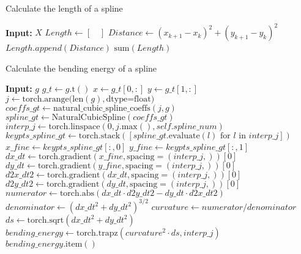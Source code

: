 \documentclass{article}
\begin{document}
\begin{algorithm}
\caption{Calculate the length of a spline}
\begin{algorithmic}[1]
\STATE \textbf{Input:} $X$
\STATE $Length \leftarrow [\quad]$
    \STATE $Distance \leftarrow (x_{k+1}-x_{k})^2+(y_{k+1}-y_{k})^2$
    \STATE $Length.append(Distance)$
\ENDFOR
\RETURN $\text{sum}(Length)$
\end{algorithmic}
\end{algorithm}

\begin{algorithm}
\caption{Calculate the bending energy of a spline}
\begin{algorithmic}[1]
\STATE \textbf{Input:} $g$
\STATE $g\_t \leftarrow g.\text{t}()$
\STATE $x \leftarrow g\_t[0, :]$
\STATE $y \leftarrow g\_t[1, :]$
\STATE $j \leftarrow \text{torch.arange(len}(g), \text{dtype=float)}$
\STATE $coeffs\_gt \leftarrow \text{natural\_cubic\_spline\_coeffs}(j, g)$
\STATE $spline\_gt \leftarrow \text{NaturalCubicSpline}(coeffs\_gt)$
\STATE $interp\_j \leftarrow \text{torch.linspace}(0, j.\text{max}(), self.spline\_num)$
\STATE $keypts\_spline\_gt \leftarrow \text{torch.stack}([spline\_gt.\text{evaluate}(l) \text{ for } l \text{ in } interp\_j])$
\STATE $x\_fine \leftarrow keypts\_spline\_gt[:, 0]$
\STATE $y\_fine \leftarrow keypts\_spline\_gt[:, 1]$
\STATE $dx\_dt \leftarrow \text{torch.gradient}(x\_fine, \text{spacing}=(interp\_j,))[0]$
\STATE $dy\_dt \leftarrow \text{torch.gradient}(y\_fine, \text{spacing}=(interp\_j,))[0]$
\STATE $d2x\_dt2 \leftarrow \text{torch.gradient}(dx\_dt, \text{spacing}=(interp\_j,))[0]$
\STATE $d2y\_dt2 \leftarrow \text{torch.gradient}(dy\_dt, \text{spacing}=(interp\_j,))[0]$
\STATE $numerator \leftarrow \text{torch.abs}(dx\_dt \cdot d2y\_dt2 - dy\_dt \cdot d2x\_dt2)$
\STATE $denominator \leftarrow (dx\_dt^2 + dy\_dt^2)^{3/2}$
\STATE $curvature \leftarrow numerator / denominator$
\STATE $ds \leftarrow \text{torch.sqrt}(dx\_dt^2 + dy\_dt^2)$
\STATE $bending\_energy \leftarrow \text{torch.trapz}(curvature^2 \cdot ds, interp\_j)$
\RETURN $bending\_energy.\text{item}()$
\end{algorithmic}
\end{algorithm}
\end{document}
